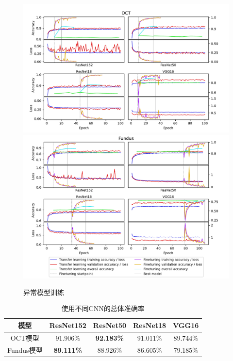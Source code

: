 \documentclass{article}
\begin{document}
		\begin{figure}[htbp]
			\centering
			\includegraphics[width=\linewidth]{Figs/abnormity_OCT_loss_and_acc.pdf}
			\includegraphics[width=\linewidth]{Figs/abnormity_Fundus_loss_and_acc.pdf}
			\caption{异常模型训练}
			\label{fig:A_train}
		\end{figure}
		
		\pagebreak
		
		{
		\fontsize{9}{12}\selectfont
		{
			\begin{table}
				\centering
				\caption{使用不同CNN的总体准确率}
				\label{tb:A_accuracies}
				\begin{tabular}{ccccc}
					\toprule
					模型&ResNet152&ResNet50&ResNet18&VGG16\\
					\midrule
					OCT模型   &91.906\%&\textbf{92.183\%}&91.011\%&89.744\% \\
					Fundus模型&\textbf{89.111\%}&88.926\%&86.605\%&79.185\% \\
					\bottomrule
				\end{tabular}
			\end{table}
		}
		}	
		
\end{document}

